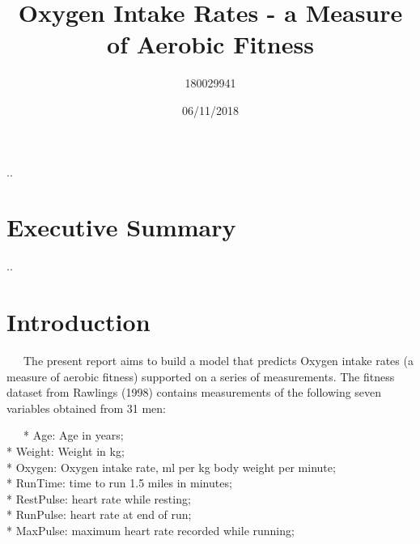 \documentclass[]{article}
\title{Oxygen Intake Rates - a Measure of Aerobic Fitness}
\author{180029941}
\date{06/11/2018}
\begin{document}
\maketitle

{
\setcounter{tocdepth}{2}
\tableofcontents
}
\pagebreak..

\section{Executive Summary}\label{executive-summary}

\pagebreak..

\section{Introduction}\label{introduction}

~~~The present report aims to build a model that predicts Oxygen intake
rates (a measure of aerobic fitness) supported on a series of
measurements. The fitness dataset from Rawlings (1998) contains
measurements of the following seven variables obtained from 31 men:

~~~* Age: Age in years;\\
\hspace*{0.333em}\hspace*{0.333em}\hspace*{0.333em}* Weight: Weight in
kg;\\
\hspace*{0.333em}\hspace*{0.333em}\hspace*{0.333em}* Oxygen: Oxygen
intake rate, ml per kg body weight per minute;\\
\hspace*{0.333em}\hspace*{0.333em}\hspace*{0.333em}* RunTime: time to
run 1.5 miles in minutes;\\
\hspace*{0.333em}\hspace*{0.333em}\hspace*{0.333em}* RestPulse: heart
rate while resting;\\
\hspace*{0.333em}\hspace*{0.333em}\hspace*{0.333em}* RunPulse: heart
rate at end of run;\\
\hspace*{0.333em}\hspace*{0.333em}\hspace*{0.333em}* MaxPulse: maximum
heart rate recorded while running;
\end{document}
